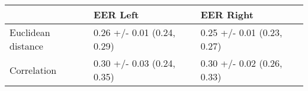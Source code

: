 \begin{tabular}{lll}
\toprule
{} &                    EER Left &                   EER Right \\
\midrule
Euclidean distance &  0.26 +/- 0.01 (0.24, 0.29) &  0.25 +/- 0.01 (0.23, 0.27) \\
Correlation        &  0.30 +/- 0.03 (0.24, 0.35) &  0.30 +/- 0.02 (0.26, 0.33) \\
\bottomrule
\end{tabular}
